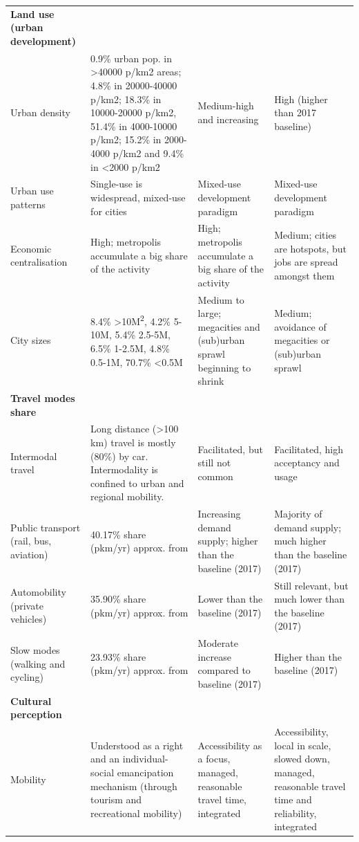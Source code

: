 \begin{landscape}
{\begin{longtable}{p{3cm}p{5cm}p{5cm}p{5cm}}
\textbf{Land use (urban development)} &  &  &  \\*
Urban density & 0.9\% urban pop. in \textgreater40000 p/km2 areas; 4.8\% in 20000-40000 p/km2; 18.3\% in 10000-20000 p/km2, 51.4\% in 4000-10000 p/km2; 15.2\% in 2000-4000 p/km2 and 9.4\% in \textless2000 p/km2 \parencite{cox2017_DemographiaWorldUrban} & Medium-high and increasing & High (higher than 2017 baseline) \\*
Urban use patterns & Single-use is widespread, mixed-use for cities & Mixed-use development paradigm & Mixed-use development paradigm \\*
Economic centralisation & High; metropolis accumulate a big share of the activity & High; metropolis accumulate a big share of the activity & Medium; cities are hotspots, but jobs are spread amongst them \\*
City sizes & 8.4\% \textgreater10M\textsuperscript{2}, 4.2\% 5-10M, 5.4\% 2.5-5M, 6.5\% 1-2.5M, 4.8\% 0.5-1M, 70.7\% \textless0.5M \parencite{cox2017_DemographiaWorldUrban} & Medium to large; megacities and (sub)urban sprawl beginning to shrink & Medium; avoidance of megacities or (sub)urban sprawl \\\addlinespace
\textbf{Travel modes share} &  &  &  \\*
Intermodal travel & Long distance (\textgreater100 km) travel is mostly (80\%) by car. Intermodality is confined to urban and regional mobility. \parencite{riley2010_IntermodalPassengerTransport} & Facilitated, but still not common & Facilitated, high acceptancy and usage \\*
Public transport (rail, bus, aviation) & 40.17\% share (pkm/yr) approx. from \parencite{vuuren2017_Energylanduse} & Increasing demand supply; higher than the baseline (2017) & Majority of demand supply; much higher than the baseline (2017) \\*
Automobility (private vehicles) & 35.90\% share (pkm/yr) approx. from \parencite{vuuren2017_Energylanduse} & Lower than the baseline (2017) & Still relevant, but much lower than the baseline (2017) \\*
Slow modes (walking and cycling) & 23.93\% share (pkm/yr) approx. from \parencite{vuuren2017_Energylanduse} & Moderate increase compared to baseline (2017) & Higher than the baseline (2017) \\\addlinespace
\textbf{Cultural perception} &  &  &  \\*
Mobility & Understood as a right and an individual-social emancipation mechanism (through tourism and recreational mobility) \parencite{sheller2008_MobilityFreedomPublic} & Accessibility as a focus, managed, reasonable travel time, integrated & Accessibility, local in scale, slowed down, managed, reasonable travel time and reliability, integrated \\*

\end{longtable}}
\end{landscape}
